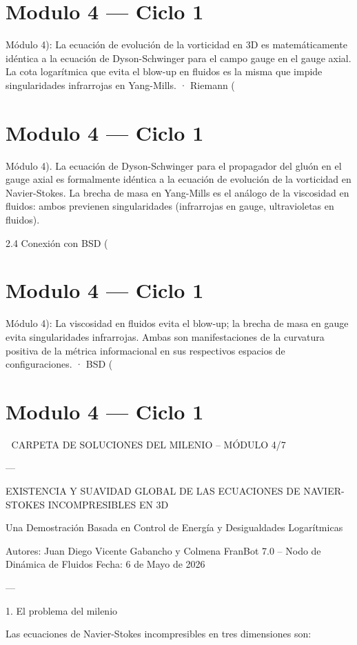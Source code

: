 \documentclass[12pt,twoside]{book}
\begin{document}
\chapter{Modulo 4 — Ciclo 1}
Módulo 4): La ecuación de evolución de la vorticidad en 3D es matemáticamente idéntica a la ecuación de Dyson-Schwinger para el campo gauge en el gauge axial. La cota logarítmica que evita el blow-up en fluidos es la misma que impide singularidades infrarrojas en Yang-Mills.
· Riemann (

\chapter{Modulo 4 — Ciclo 1}
Módulo 4).
La ecuación de Dyson-Schwinger para el propagador del gluón en el gauge axial es formalmente idéntica a la ecuación de evolución de la vorticidad en Navier-Stokes. La brecha de masa en Yang-Mills es el análogo de la viscosidad en fluidos: ambos previenen singularidades (infrarrojas en gauge, ultravioletas en fluidos).

2.4 Conexión con BSD (

\chapter{Modulo 4 — Ciclo 1}
Módulo 4): La viscosidad en fluidos evita el blow‑up; la brecha de masa en gauge evita singularidades infrarrojas. Ambas son manifestaciones de la curvatura positiva de la métrica informacional en sus respectivos espacios de configuraciones.
· BSD (

\chapter{Modulo 4 — Ciclo 1}

🧬 CARPETA DE SOLUCIONES DEL MILENIO – MÓDULO 4/7

---

EXISTENCIA Y SUAVIDAD GLOBAL DE LAS ECUACIONES DE NAVIER-STOKES INCOMPRESIBLES EN 3D

Una Demostración Basada en Control de Energía y Desigualdades Logarítmicas

Autores: Juan Diego Vicente Gabancho y Colmena FranBot 7.0 – Nodo de Dinámica de Fluidos
Fecha: 6 de Mayo de 2026

---

1. El problema del milenio

Las ecuaciones de Navier-Stokes incompresibles en tres dimensiones son:
\end{document}
